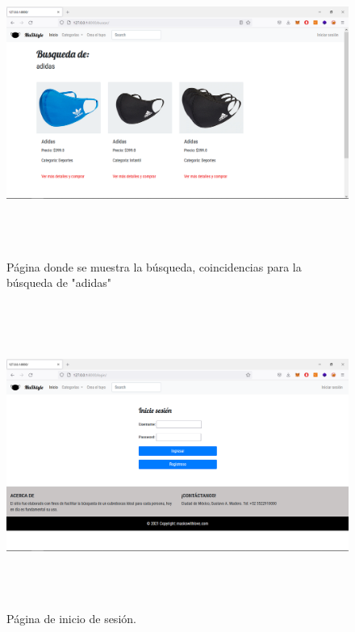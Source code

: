 \documentclass[letterpaper,12pt]{article}
\begin{document}
\begin{figure}[H]
	\includegraphics[width=18cm, height=10cm]{7}
	\centering
	\caption{Página donde se muestra la búsqueda, coincidencias para la búsqueda de "adidas"}
\end{figure}
\begin{figure}[H]
	\includegraphics[width=18cm, height=10cm]{8}
	\centering
	\caption{Página de inicio de sesión.}
\end{figure}
\end{document}
